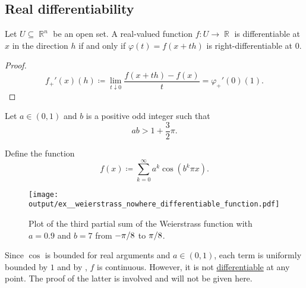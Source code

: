\subsection{Real differentiability}\label{subsec:real_differentiability}

\begin{proposition}\label{thm:real_valued_differentiability}
  Let \( U \subseteq \BbbR^n \) be an open set. A real-valued function \( f: U \to \BbbR \) is differentiable at \( x \) in the direction \( h \) if and only if \( \varphi(t) = f(x + th) \) is right-differentiable at \( 0 \).
\end{proposition}
\begin{proof}
  \begin{equation*}
    f_+'(x)(h) \coloneqq \lim_{t \downarrow 0} \frac {f(x + th) - f(x)} t = \varphi_+'(0)(1).
  \end{equation*}
\end{proof}

\begin{example}\label{ex:weierstrass_nowhere_differentiable_function}
  Let \( a \in (0, 1) \) and \( b \) is a positive odd integer such that
  \begin{equation*}
    ab > 1 + \frac 3 2 \pi.
  \end{equation*}

  Define the function
  \begin{equation*}
    f(x) \coloneqq \sum_{k=0}^\infty a^k \cos(b^k \pi x).
  \end{equation*}

  \begin{figure}[!ht]
    \centering
    \texttt{[image: output/ex\_\_weierstrass\_nowhere\_differentiable\_function.pdf]}
    \caption
    {
      Plot of the third partial sum of the Weierstrass function with \( a = 0.9 \) and \( b = 7 \) from \( -\ifrac \pi 8 \) to \( \ifrac \pi 8 \).
    }
    \label{fig:ex:weierstrass_nowhere_differentiable_function/plot}
  \end{figure}

  Since \( \cos \) is bounded for real arguments and \( a \in (0, 1) \), each term is uniformly bounded by \( 1 \) and by , \( f \) is continuous. However, it is not \hyperref[def:differentiability]{differentiable} at any point. The proof of the latter is involved and will not be given here.
\end{example}

